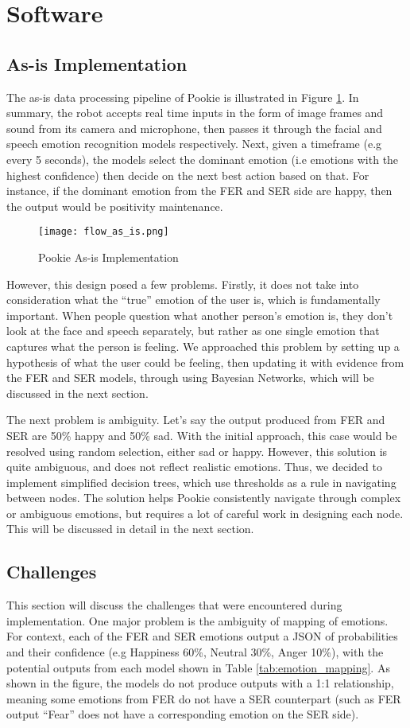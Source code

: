 \section{Software}
\subsection{As-is Implementation}
The as-is data processing pipeline of Pookie is illustrated in Figure \ref{fig:flow-as-is}. In summary, the robot accepts real time inputs in the form of image frames and sound from its camera and microphone, then passes it through the facial and speech emotion recognition models respectively. Next, given a timeframe (e.g every 5 seconds), the models select the dominant emotion (i.e emotions with the highest confidence) then decide on the next best action based on that. For instance, if the dominant emotion from the FER and SER side are happy, then the output would be positivity maintenance. 

\begin{figure}[ht]
    \centering
    \texttt{[image: flow\_as\_is.png]}
    \caption{Pookie As-is Implementation}
    \label{fig:flow-as-is}
\end{figure}

However, this design posed a few problems. Firstly, it does not take into consideration what the “true” emotion of the user is, which is fundamentally important. When people question what another person’s emotion is, they don’t look at the face and speech separately, but rather as one single emotion that captures what the person is feeling. We approached this problem by setting up a hypothesis of what the user could be feeling, then updating it with evidence from the FER and SER models, through using Bayesian Networks, which will be discussed in the next section. 

The next problem is ambiguity. Let’s say the output produced from FER and SER are 50\% happy and 50\% sad. With the initial approach, this case would be resolved using random selection, either sad or happy. However, this solution is quite ambiguous, and does not reflect realistic emotions. Thus, we decided to implement simplified decision trees, which use thresholds as a rule in navigating between nodes. The solution helps Pookie consistently navigate through complex or ambiguous emotions, but requires a lot of careful work in designing each node. This will be discussed in detail in the next section. 


\subsection{Challenges}
This section will discuss the challenges that were encountered during implementation. One major problem is the ambiguity of mapping of emotions. For context, each of the FER and SER emotions output a JSON of probabilities and their confidence (e.g Happiness 60\%, Neutral 30\%, Anger 10\%), with the potential outputs from each model shown in Table \ref{tab:emotion_mapping}. As shown in the figure, the models do not produce outputs with a 1:1 relationship, meaning some emotions from FER do not have a SER counterpart (such as FER output “Fear” does not have a corresponding emotion on the SER side). 

